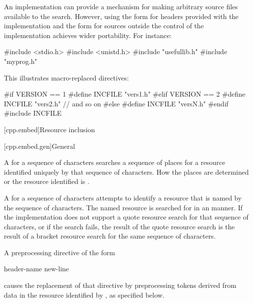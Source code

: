 \pnum
\begin{note}
An implementation can provide a mechanism for making arbitrary
source files available to the \tcode{< >} search.
However, using the \tcode{< >} form for headers provided
with the implementation and the  form for sources
outside the control of the implementation
achieves wider portability. For instance:

\begin{codeblock}
#include <stdio.h>
#include <unistd.h>
#include "usefullib.h"
#include "myprog.h"
\end{codeblock}

\end{note}

\pnum
\begin{example}
This illustrates macro-replaced
directives:

\begin{codeblock}
#if VERSION == 1
    #define INCFILE  "vers1.h"
#elif VERSION == 2
    #define INCFILE  "vers2.h"  // and so on
#else
    #define INCFILE  "versN.h"
#endif
#include INCFILE
\end{codeblock}
\end{example}

[cpp.embed]{Resource inclusion}
%

[cpp.embed.gen]{General}

\pnum
A  for a sequence of characters
searches a sequence of places for a resource identified uniquely
by that sequence of characters.
How the places are determined or the resource identified
is .

\pnum
A  for a sequence of characters
attempts to identify a resource that is named by the sequence of characters.
The named resource is searched for
in an  manner.
If the implementation does not support a quote resource search
for that sequence of characters, or if the search fails,
the result of the quote resource search
is the result of a bracket resource search for the same sequence of characters.

\pnum
A preprocessing directive of the form
\begin{ncsimplebnf}
 header-name  new-line
\end{ncsimplebnf}
causes the replacement of that directive
by preprocessing tokens derived from data
in the resource identified by ,
as specified below.

